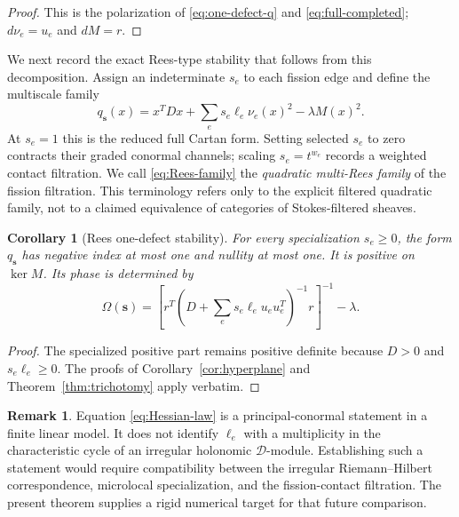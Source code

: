 \documentclass[11pt,a4paper]{amsart}
\theoremstyle{plain}
\newtheorem{corollary}[theorem]{Corollary}
\theoremstyle{definition}
\newtheorem{remark}[theorem]{Remark}
\begin{document}
\begin{proof}
This is the polarization of \eqref{eq:one-defect-q} and
\eqref{eq:full-completed}; $d\nu_e=u_e$ and $dM=r$.
\end{proof}

We next record the exact Rees-type stability that follows from this decomposition.  Assign an
indeterminate $s_e$ to each fission edge and define the multiscale family
\begin{equation}\label{eq:Rees-family}
 q_{\boldsymbol s}(x)=x^TDx+
   \sum_e s_e\ell_e\nu_e(x)^2-\lambda M(x)^2.
\end{equation}
At $s_e=1$ this is the reduced full Cartan form.  Setting selected $s_e$ to zero contracts their
graded conormal channels; scaling $s_e=t^{w_e}$ records a weighted contact filtration.  We call
\eqref{eq:Rees-family} the \emph{quadratic multi-Rees family} of the fission filtration.  This
terminology refers only to the explicit filtered quadratic family, not to a claimed equivalence of
categories of Stokes-filtered sheaves.

\begin{corollary}[Rees one-defect stability]\label{cor:Rees-stability}
For every specialization $s_e\ge0$, the form $q_{\boldsymbol s}$ has negative index at most one and
nullity at most one.  It is positive on $\ker M$.  Its phase is determined by
\begin{equation}\label{eq:Rees-gap}
 \Omega(\boldsymbol s)=
 \left[r^T\left(D+\sum_e s_e\ell_eu_eu_e^T\right)^{-1}r\right]^{-1}
 -\lambda.
\end{equation}
\end{corollary}

\begin{proof}
The specialized positive part remains positive definite because $D>0$ and $s_e\ell_e\ge0$.
The proofs of Corollary~\ref{cor:hyperplane} and Theorem~\ref{thm:trichotomy} apply verbatim.
\end{proof}

\begin{remark}
Equation \eqref{eq:Hessian-law} is a principal-conormal statement in a finite linear model.  It
does not identify $\ell_e$ with a multiplicity in the characteristic cycle of an irregular
holonomic $\mathcal D$-module.  Establishing such a statement would require compatibility between
the irregular Riemann--Hilbert correspondence, microlocal specialization, and the fission-contact
filtration.  The present theorem supplies a rigid numerical target for that future comparison.
\end{remark}
\end{document}
